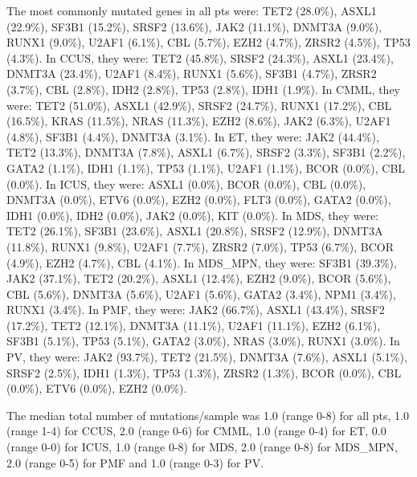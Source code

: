 The most commonly mutated genes in all pts were: TET2 (28.0\%), ASXL1 (22.9\%), SF3B1 (15.2\%), SRSF2 (13.6\%), JAK2 (11.1\%), DNMT3A (9.0\%), RUNX1 (9.0\%), U2AF1 (6.1\%), CBL (5.7\%), EZH2 (4.7\%), ZRSR2 (4.5\%), TP53 (4.3\%). In CCUS, they were: TET2 (45.8\%), SRSF2 (24.3\%), ASXL1 (23.4\%), DNMT3A (23.4\%), U2AF1 (8.4\%), RUNX1 (5.6\%), SF3B1 (4.7\%), ZRSR2 (3.7\%), CBL (2.8\%), IDH2 (2.8\%), TP53 (2.8\%), IDH1 (1.9\%). In CMML, they were: TET2 (51.0\%), ASXL1 (42.9\%), SRSF2 (24.7\%), RUNX1 (17.2\%), CBL (16.5\%), KRAS (11.5\%), NRAS (11.3\%), EZH2 (8.6\%), JAK2 (6.3\%), U2AF1 (4.8\%), SF3B1 (4.4\%), DNMT3A (3.1\%). In ET, they were: JAK2 (44.4\%), TET2 (13.3\%), DNMT3A (7.8\%), ASXL1 (6.7\%), SRSF2 (3.3\%), SF3B1 (2.2\%), GATA2 (1.1\%), IDH1 (1.1\%), TP53 (1.1\%), U2AF1 (1.1\%), BCOR (0.0\%), CBL (0.0\%). In ICUS, they were: ASXL1 (0.0\%), BCOR (0.0\%), CBL (0.0\%), DNMT3A (0.0\%), ETV6 (0.0\%), EZH2 (0.0\%), FLT3 (0.0\%), GATA2 (0.0\%), IDH1 (0.0\%), IDH2 (0.0\%), JAK2 (0.0\%), KIT (0.0\%). In MDS, they were: TET2 (26.1\%), SF3B1 (23.6\%), ASXL1 (20.8\%), SRSF2 (12.9\%), DNMT3A (11.8\%), RUNX1 (9.8\%), U2AF1 (7.7\%), ZRSR2 (7.0\%), TP53 (6.7\%), BCOR (4.9\%), EZH2 (4.7\%), CBL (4.1\%). In MDS_MPN, they were: SF3B1 (39.3\%), JAK2 (37.1\%), TET2 (20.2\%), ASXL1 (12.4\%), EZH2 (9.0\%), BCOR (5.6\%), CBL (5.6\%), DNMT3A (5.6\%), U2AF1 (5.6\%), GATA2 (3.4\%), NPM1 (3.4\%), RUNX1 (3.4\%). In PMF, they were: JAK2 (66.7\%), ASXL1 (43.4\%), SRSF2 (17.2\%), TET2 (12.1\%), DNMT3A (11.1\%), U2AF1 (11.1\%), EZH2 (6.1\%), SF3B1 (5.1\%), TP53 (5.1\%), GATA2 (3.0\%), NRAS (3.0\%), RUNX1 (3.0\%). In PV, they were: JAK2 (93.7\%), TET2 (21.5\%), DNMT3A (7.6\%), ASXL1 (5.1\%), SRSF2 (2.5\%), IDH1 (1.3\%), TP53 (1.3\%), ZRSR2 (1.3\%), BCOR (0.0\%), CBL (0.0\%), ETV6 (0.0\%), EZH2 (0.0\%).

The median total number of mutations/sample was 1.0 (range 0-8) for all pts, 1.0 (range 1-4) for CCUS, 2.0 (range 0-6) for CMML, 1.0 (range 0-4) for ET, 0.0 (range 0-0) for ICUS, 1.0 (range 0-8) for MDS, 2.0 (range 0-8) for MDS_MPN, 2.0 (range 0-5) for PMF and 1.0 (range 0-3) for PV.


